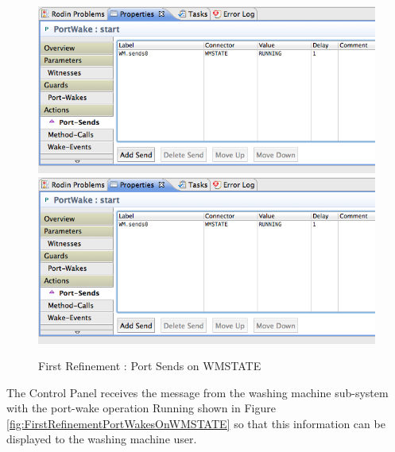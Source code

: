  \begin{figure}[!htbp]
  \centering
  \ifplastex
  \includegraphics[width=1024]{figures/image22.png}
  \else
  \includegraphics[width=1\textwidth]{figures/image22.png}
  \fi
  \caption{First Refinement : Port Sends on WMSTATE}
  \label{fig:FirstRefinementPortSendsOnWMSTATE}
\end{figure} 

The Control Panel receives the message from the washing machine sub-system with the port-wake operation Running shown in Figure \ref{fig:FirstRefinementPortWakesOnWMSTATE} so that this information can be displayed to the washing machine user.
 
